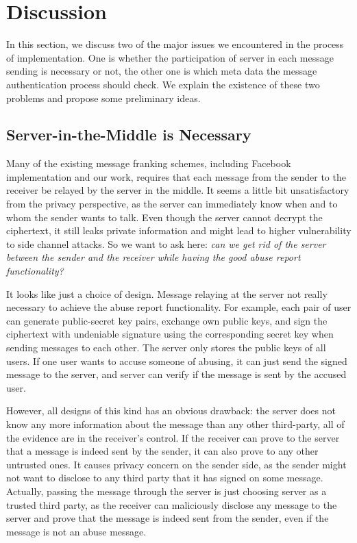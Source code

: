 
\section{Discussion}
In this section, we discuss two of the major issues we encountered in the process of implementation.
One is whether the participation of server in each message sending is necessary or not,
the other one is which meta data the message authentication process should check.
We explain the existence of these two problems
and propose some preliminary ideas.


\subsection{Server-in-the-Middle is Necessary}
Many of the existing message franking schemes,
including Facebook implementation and our work,
requires that each message from the sender to the receiver be relayed by the server in the middle.
It seems a little bit unsatisfactory from the privacy perspective,
as the server can immediately know when and to whom the sender wants to talk.
Even though the server cannot decrypt the ciphertext,
it still leaks private information and might lead to higher vulnerability to side channel attacks.
So we want to ask here: \emph{can we get rid of the server between the sender and the receiver while having the good abuse report functionality?}

It looks like just a choice of design.
Message relaying at the server not really necessary to achieve the abuse report functionality.
For example, each pair of user can generate public-secret key pairs, exchange own public keys,
and sign the ciphertext with undeniable signature using the corresponding secret key when sending messages to each other.
The server only stores the public keys of all users.
If one user wants to accuse someone of abusing, it can just send the signed message to the server,
and server can verify if the message is sent by the accused user.

However, all designs of this kind has an obvious drawback:
the server does not know any more information about the message than any other third-party,
all of the evidence are in the receiver's control. 
If the receiver can prove to the server that a message is indeed sent by the sender,
it can also prove to any other untrusted ones.
It causes privacy concern on the sender side, 
as the sender might not want to disclose to any third party that it has signed on some message.
Actually, passing the message through the server
is just choosing server as a trusted third party,
as the receiver can maliciously disclose any message to the server and prove that the message is indeed sent from the sender,
even if the message is not an abuse message.


